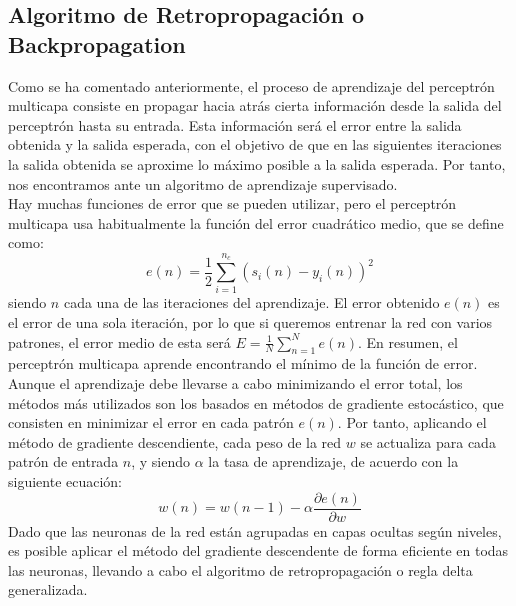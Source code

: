 \subsection{Algoritmo de Retropropagación o Backpropagation} \label{backpropagation}
Como se ha comentado anteriormente, el proceso de aprendizaje del perceptrón multicapa consiste en propagar hacia atrás cierta información desde la salida del perceptrón hasta su entrada. Esta información será el error entre la salida obtenida y la salida esperada, con el objetivo de que en las siguientes iteraciones la salida obtenida se aproxime lo máximo posible a la salida esperada. Por tanto, nos encontramos ante un algoritmo de aprendizaje supervisado.\\
Hay muchas funciones de error que se pueden utilizar, pero el perceptrón multicapa usa habitualmente la función del error cuadrático medio, que se define como:
\begin{equation}
e(n) = \frac{1}{2}\sum_{i=1}^{n_{c}}(s_{i}(n)-y_{i}(n))^{2}
\end{equation}
siendo ${n}$ cada una de las iteraciones del aprendizaje. El error obtenido ${e(n)}$ es el error de una sola iteración, por lo que si queremos entrenar la red con varios patrones, el error medio de esta será ${E=\frac{1}{N}\sum_{n=1}^{N}e(n)}$. En resumen, el perceptrón multicapa aprende encontrando el mínimo de la función de error.\\
Aunque el aprendizaje debe llevarse a cabo minimizando el error total, los métodos más utilizados son los basados en métodos de gradiente estocástico, que consisten en minimizar el error en cada patrón ${e(n)}$. Por tanto, aplicando el método de gradiente descendiente, cada peso de la red ${w}$ se actualiza para cada patrón de entrada ${n}$, y siendo ${\alpha}$ la tasa de aprendizaje, de acuerdo con la siguiente ecuación:
\begin{equation}
w(n)=w(n-1)-\alpha \frac{\partial e(n)}{\partial w}
\label{eq_grad}
\end{equation}
Dado que las neuronas de la red están agrupadas en capas ocultas según niveles, es posible aplicar el método del gradiente descendente de forma eficiente en todas las neuronas, llevando a cabo el algoritmo de retropropagación o regla delta generalizada.

